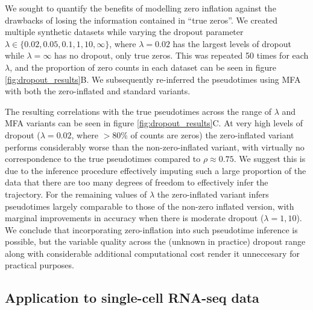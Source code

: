 We sought to quantify the benefits of modelling zero inflation against the drawbacks of losing the information contained in ``true zeros''. We created multiple synthetic datasets while varying the dropout parameter $\lambda \in \{0.02, 0.05, 0.1, 1, 10, \infty\}$, where $\lambda = 0.02$ has the largest levels of dropout while $\lambda = \infty$ has no dropout, only true zeros. This was repeated 50 times for each $\lambda$, and the proportion of zero counts in each dataset can be seen in figure \ref{fig:dropout_results}B. We subsequently re-inferred the pseudotimes using MFA with both the zero-inflated and standard variants.

The resulting correlations with the true pseudotimes across the range of $\lambda$ and MFA variants can be seen in figure \ref{fig:dropout_results}C. At very high levels of dropout ($\lambda = 0.02$, where $>80\%$ of counts are zeros) the zero-inflated variant performs considerably worse than the non-zero-inflated variant, with virtually no correspondence to the true pseudotimes compared to $\rho \approx 0.75$. We suggest this is due to the inference procedure effectively imputing such a large proportion of the data that there are too many degrees of freedom to effectively infer the trajectory. For the remaining values of $\lambda$ the zero-inflated variant infers pseudotimes largely comparable to those of the non-zero inflated version, with marginal improvements in accuracy when there is moderate dropout ($\lambda = 1, 10$). We conclude that incorporating zero-inflation into such pseudotime inference is possible, but the variable quality across the (unknown in practice) dropout range along with considerable additional computational cost render it unneccesary for practical purposes.

\subsection{Application to single-cell RNA-seq data}

